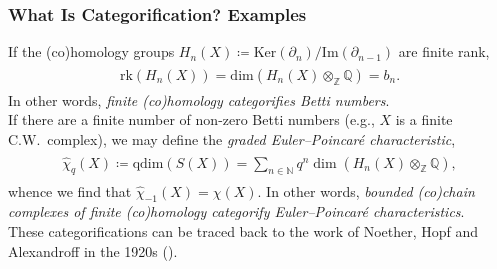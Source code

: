 \documentclass{beamer}
\newcommand*{\emphasis}[1]{\textcolor{structure}{\em #1}}
\begin{document}
\begin{frame}
\frametitle{What Is Categorification? Examples}
If the (co)homology groups $H_n(X) \coloneqq \mathrm{Ker}(\partial_n)/\mathrm{Im}(\partial_{n-1})$ are finite rank,
\begin{align*}
\begin{split}
\mathrm{rk}(H_n(X)) = \mathrm{dim}(H_n(X) \otimes_\mathbb{Z} \mathbb{Q}) = b_n.
\end{split}
\end{align*}
In other words, \emphasis{finite (co)homology categorifies Betti numbers}.\\[2ex]
If there are a finite number of non-zero Betti numbers (e.g., $X$ is a finite C.W.\ complex), we may define the \emphasis{graded Euler--Poincar\'{e} characteristic},
\begin{align*}
\begin{split}
\widehat{\chi}_q(X) \coloneqq \mathrm{qdim}(S(X)) = \sum_{n \in \mathbb{N}}{q^n\dim(H_n(X) \otimes_\mathbb{Z} \mathbb{Q})},
\end{split}
\end{align*}
whence we find that $\widehat{\chi}_{-1}(X) = \chi(X)$. In other words, \emphasis{bounded (co)chain complexes of finite (co)homology categorify Euler--Poincar\'{e} characteristics}.\\[2ex]
These categorifications can be traced back to the work of Noether, Hopf and Alexandroff in the 1920s (\textcolor{structure}{\cite{Hir99}}).
\end{frame}


\end{document}
